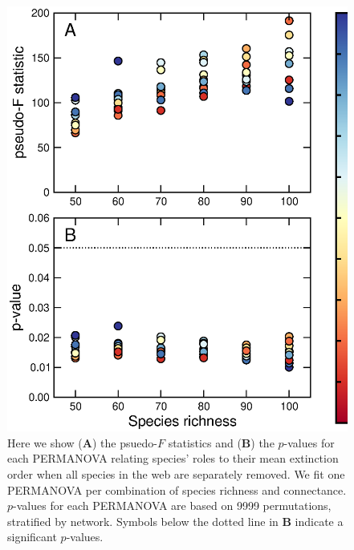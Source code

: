\documentclass[12pt]{article}
\begin{document}
	\begin{figure}[h!]
		\caption{Here we show (\textbf{A}) the psuedo-$F$ statistics and (\textbf{B}) the $p$-values for each PERMANOVA relating species' roles to their mean extinction order when all species in the web are separately removed. We fit one PERMANOVA per combination of species richness and connectance. $p$-values for each PERMANOVA are based on 9999 permutations, stratified by network. Symbols below the dotted line in \textbf{B} indicate a significant $p$-values.}
		\label{permfig}
		\includegraphics[height=.75\textheight]{figures/extinction_order/permanova_summary_paper_full.eps}
		\end{figure}
\end{document}
